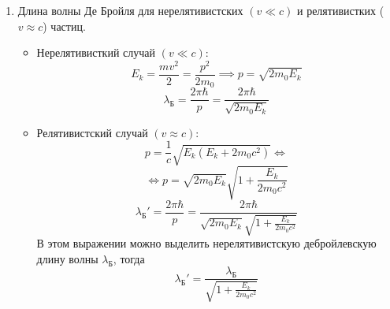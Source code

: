 \begin{multicols}{2}
\begin{enumerate}[label=\textbf{№~\arabic{enumi}}]
	\item Длина волны Де Бройля для нерелятивистских $(v\ll c)$ и релятивистких ($v\approx c$) частиц.
	\begin{itemize}
		\item Нерелятивисткий случай $(v\ll c)$:
		\begin{equation*}
		E_k=\frac{mv^2}{2}=\frac{p^2}{2m_0}\implies p=\sqrt{2m_0E_k}
		\end{equation*}
		\begin{equation*}
		\lambda_\text{Б}=\frac{2\pi\hbar}{p}=\frac{2\pi\hbar}{\sqrt{2m_0E_k}}
		\end{equation*}
		\item Релятивистский случай $(v\approx c)$:
		\begin{equation*}
		p=\frac{1}{c}\sqrt{E_k(E_k+2m_0c^2)} \Leftrightarrow
		\end{equation*}
		\begin{equation*}
		\Leftrightarrow p=\sqrt{2m_0E_k}\sqrt{1+\frac{E_k}{2m_0c^2}}
		\end{equation*}
		\begin{equation*}
			\lambda_\text{Б}'=\frac{2\pi\hbar}{p}=\frac{2\pi\hbar}{\sqrt{2m_0E_k}\sqrt{1+\frac{E_k}{2m_0c^2}}}
		\end{equation*}
		В этом выражении можно выделить нерелятивистскую дебройлевскую длину волны $\lambda_\text{Б}$, тогда 
		\begin{equation*}
			\lambda_\text{Б}'=\frac{\lambda_\text{Б}}{\sqrt{1+\frac{E_k}{2m_0c^2}}}
		\end{equation*}
	\end{itemize}
\end{enumerate}

\end{multicols}
